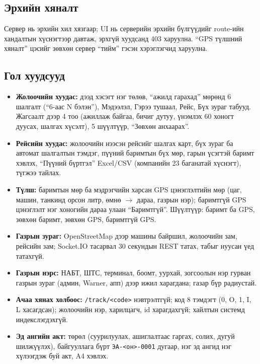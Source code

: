 \documentclass[
12pt,
oneside,
english,
onehalfspacing,
nolistspacing,
headsepline,
]{MUST-Thesis}
\begin{document}
\subsection{Эрхийн хяналт}

Сервер нь эрхийн хил хязгаар; UI нь серверийн эрхийн бүлгүүдийг route-ийн хандалтын хүснэгтээр давтаж, эрхгүй хуудсанд 403 харуулна. ``GPS түлшний хяналт'' цэсийг зөвхөн сервер ``тийм'' гэсэн хэрэглэгчид харуулна.

\subsection{Гол хуудсууд}

\begin{itemize}
    \item \textbf{Жолоочийн хуудас:} дээд хэсэгт нэг төлөв, ``ажилд гарахад'' мөрөнд 6 шалгалт (``6-аас N бэлэн''), Мэдээлэл, Гэрээ тушаал, Рейс, Бүх зураг табууд. Жагсаалт дээр 4 тоо (ажиллаж байгаа, бичиг дутуу, үнэмлэх 60 хоногт дуусах, шалгах хүсэлт), 5 шүүлтүүр, ``Зөвхөн анхаарах''.
    \item \textbf{Рейсийн хуудас:} жолоочийн нээсэн рейсийг шалгах карт, бүх зураг ба автомат шалгалтын тэмдэг, пүүний баримтын бүх мөр, гарын үсэгтэй баримт хэвлэх, ``Пүүний бүртгэл'' Excel/CSV (компанийн 23 баганатай хүснэгт), түгжээ тайлах.
    \item \textbf{Түлш:} баримтын мөр ба мэдрэгчийн харсан GPS цэнэглэлтийн мөр (цаг, машин, танкинд орсон литр, өмнө $\rightarrow$ дараа, газрын нэр); баримтгүй GPS цэнэглэлт нэг хоногийн дараа улаан ``Баримтгүй''. Шүүлтүүр: баримт ба GPS, зөвхөн баримт, зөвхөн GPS, баримтгүй GPS.
    \item \textbf{Газрын зураг:} OpenStreetMap дээр машины байршил, жолоочийн зам, рейсийн зам; Socket.IO тасарвал 30 секундын REST татах, табыг нуусан үед татахгүй.
    \item \textbf{Газрын нэрс:} НАБТ, ШТС, терминал, боомт, уурхай, зогсоолын нэр гурван газрын зураг (админ, Warner, апп) дээр ижил харагдана; газар бүр радиустай.
    \item \textbf{Ачаа хянах холбоос:} \texttt{/track/<code>} нэвтрэлтгүй; код 8 тэмдэгт (0, O, 1, I, L хасагдсан); жолоочийн нэр, харилцагч, id харагдахгүй; хайлтын системд индекслэгдэхгүй.
    \item \textbf{Эд ангийн акт:} төрөл (суурилуулах, ашиглалтаас гаргах, солих, дугуй шилжүүлэх), байгууллага бүрт \texttt{ЭА-<он>-0001} дугаар, нэг эд ангид нэг хүлээгдэж буй акт, A4 хэвлэх.
\end{itemize}
\end{document}
